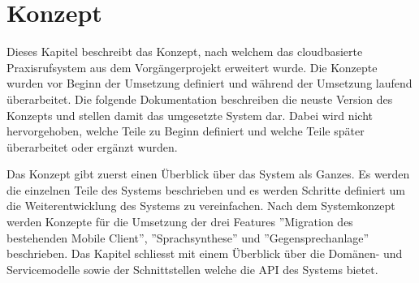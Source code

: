 \section{Konzept}

Dieses Kapitel beschreibt das Konzept, nach welchem das cloudbasierte Praxisrufsystem aus dem Vorgängerprojekt erweitert wurde.
Die Konzepte wurden vor Beginn der Umsetzung definiert und während der Umsetzung laufend überarbeitet.
Die folgende Dokumentation beschreiben die neuste Version des Konzepts und stellen damit das umgesetzte System dar.
Dabei wird nicht hervorgehoben, welche Teile zu Beginn definiert und welche Teile später überarbeitet oder ergänzt wurden.

Das Konzept gibt zuerst einen Überblick über das System als Ganzes.
Es werden die einzelnen Teile des Systems beschrieben und es werden Schritte definiert um die Weiterentwicklung des Systems zu vereinfachen.
Nach dem Systemkonzept werden Konzepte für die Umsetzung der drei Features ''Migration des bestehenden Mobile Client'', ''Sprachsynthese'' und ''Gegensprechanlage'' beschrieben.
Das Kapitel schliesst mit einem Überblick über die Domänen- und Servicemodelle sowie der Schnittstellen welche die API des Systems bietet.






